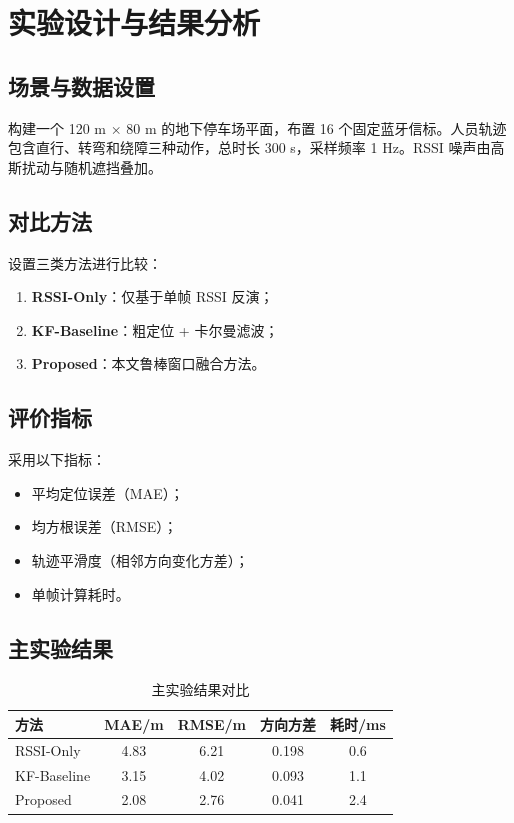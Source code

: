\chapter{实验设计与结果分析}

\section{场景与数据设置}
构建一个 120 m $\times$ 80 m 的地下停车场平面，布置 16 个固定蓝牙信标。人员轨迹包含直行、转弯和绕障三种动作，总时长 300 s，采样频率 1 Hz。RSSI 噪声由高斯扰动与随机遮挡叠加。

\section{对比方法}
设置三类方法进行比较：
\begin{enumerate}
  \item \textbf{RSSI-Only}：仅基于单帧 RSSI 反演；
  \item \textbf{KF-Baseline}：粗定位 + 卡尔曼滤波；
  \item \textbf{Proposed}：本文鲁棒窗口融合方法。
\end{enumerate}

\section{评价指标}
采用以下指标：
\begin{itemize}
  \item 平均定位误差（MAE）；
  \item 均方根误差（RMSE）；
  \item 轨迹平滑度（相邻方向变化方差）；
  \item 单帧计算耗时。
\end{itemize}

\section{主实验结果}
\begin{table}[H]
\centering
\caption{主实验结果对比}
\begin{tabular}{lcccc}
\toprule
方法 & MAE/m & RMSE/m & 方向方差 & 耗时/ms \\
\midrule
RSSI-Only & 4.83 & 6.21 & 0.198 & 0.6 \\
KF-Baseline & 3.15 & 4.02 & 0.093 & 1.1 \\
Proposed & 2.08 & 2.76 & 0.041 & 2.4 \\
\bottomrule
\end{tabular}
\end{table}


